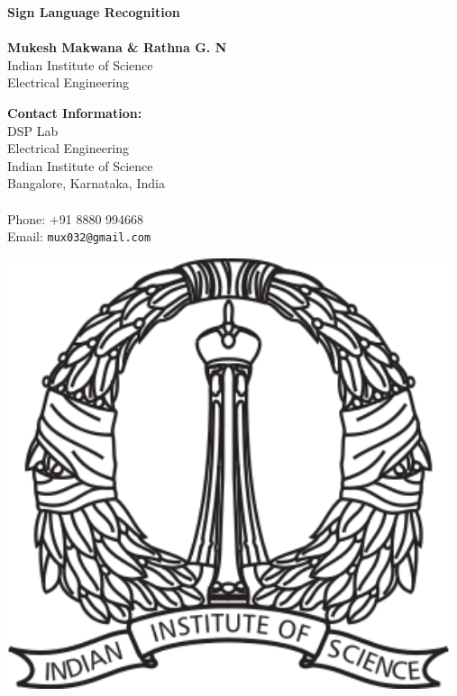 \documentclass[a0,landscape]{a0poster}
\begin{document}


\begin{minipage}[b]{0.55\linewidth}
\veryHuge \color{NavyBlue} \textbf{Sign Language Recognition} \color{Black}\\ %
\Huge\textit{}\\[1cm] %
\huge \textbf{Mukesh Makwana \& Rathna G. N}\\ %
\huge Indian Institute of Science\\
Electrical Engineering\\ %
\end{minipage}
%
\begin{minipage}[b]{0.25\linewidth}
\color{DarkSlateGray}\Large \textbf{Contact Information:}\\
DSP Lab\\
Electrical Engineering\\ %
Indian Institute of Science\\
Bangalore, Karnataka, India\\\\
Phone: +91 8880 994668\\ %
Email: \texttt{mux032@gmail.com}\\ %
\end{minipage}
%
\begin{minipage}[b]{0.19\linewidth}
\includegraphics[width=13cm]{logo.png} %
\end{minipage}
\end{document}
